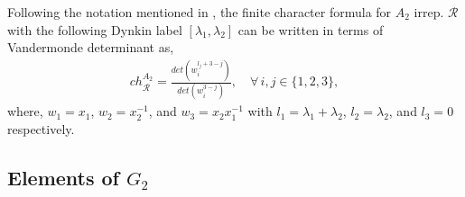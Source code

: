 \documentclass[a4paper,12pt]{article}
\begin{document}
Following the notation mentioned in \cite{Buican:2015ina}, the finite character formula for $A_2$ irrep. $\mathcal{R}$ with the following Dynkin label $[\lambda_1,\lambda_2]$ can be written in terms of Vandermonde determinant as,
\begin{align}
ch_{\mathcal{R}}^{A_2}=\frac{det(w_i^{l_j+3-j})}{det(w_i^{3-j})},\quad \forall \, i,j\in\{1,2,3\},
\end{align}
%
where, $w_1=x_1$, $w_2=x_2^{-1}$, and $w_3=x_2x_1^{-1}$ with $l_1=\lambda_1+\lambda_2$, $l_2=\lambda_2$, and $l_3=0$ respectively.

\subsection{Elements of \ensuremath{G_2}}\label{g2 basics}
\end{document}

